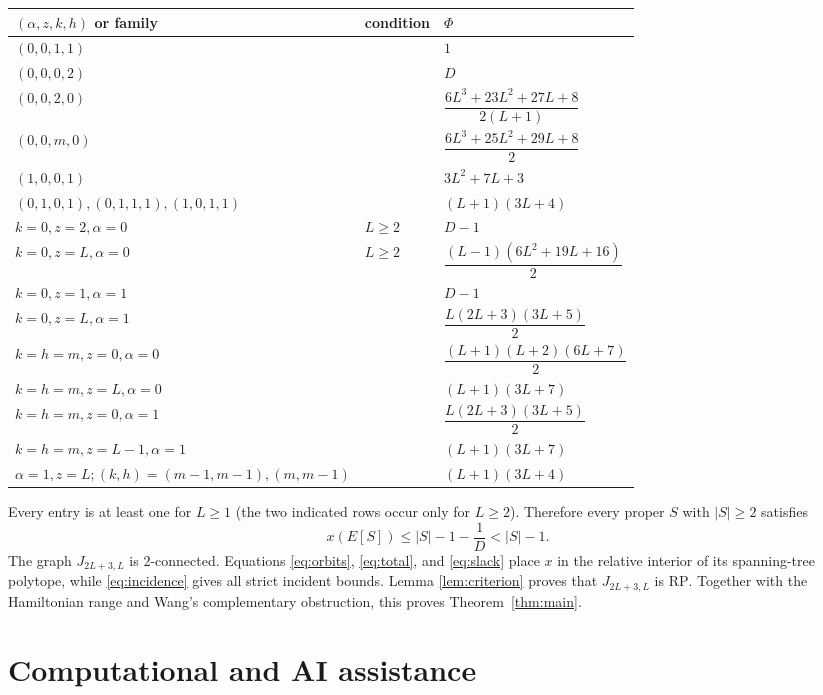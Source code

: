 \documentclass[11pt]{article}
\newcommand{\RP}{\mathrm{RP}}
\begin{document}
\begin{center}
\small
\begin{tabular}{@{}lll@{}}
\toprule
$(\alpha,z,k,h)$ or family & condition & $\Phi$ \\
\midrule
$(0,0,1,1)$ && $1$\\
$(0,0,0,2)$ && $D$\\
$(0,0,2,0)$ && $\dfrac{6L^3+23L^2+27L+8}{2(L+1)}$\\
$(0,0,m,0)$ && $\dfrac{6L^3+25L^2+29L+8}{2}$\\
$(1,0,0,1)$ && $3L^2+7L+3$\\
$(0,1,0,1),(0,1,1,1),(1,0,1,1)$ && $(L+1)(3L+4)$\\
$k=0,z=2,\alpha=0$ & $L\geq2$ & $D-1$\\
$k=0,z=L,\alpha=0$ & $L\geq2$ & $\dfrac{(L-1)(6L^2+19L+16)}2$\\
$k=0,z=1,\alpha=1$ && $D-1$\\
$k=0,z=L,\alpha=1$ && $\dfrac{L(2L+3)(3L+5)}2$\\
$k=h=m,z=0,\alpha=0$ && $\dfrac{(L+1)(L+2)(6L+7)}2$\\
$k=h=m,z=L,\alpha=0$ && $(L+1)(3L+7)$\\
$k=h=m,z=0,\alpha=1$ && $\dfrac{L(2L+3)(3L+5)}2$\\
$k=h=m,z=L-1,\alpha=1$ && $(L+1)(3L+7)$\\
$\alpha=1,z=L;(k,h)=(m-1,m-1),(m,m-1)$
&& $(L+1)(3L+4)$\\
\bottomrule
\end{tabular}
\end{center}

Every entry is at least one for $L\geq1$ (the two indicated rows occur only
for $L\geq2$).  Therefore every proper $S$ with $|S|\geq2$ satisfies
\begin{equation}\label{eq:slack}
 x(E[S])\leq |S|-1-\frac1D<|S|-1.
\end{equation}
The graph $J_{2L+3,L}$ is $2$-connected.  Equations
\eqref{eq:orbits}, \eqref{eq:total}, and \eqref{eq:slack} place $x$ in the
relative interior of its spanning-tree polytope, while
\eqref{eq:incidence} gives all strict incident bounds.  Lemma
\ref{lem:criterion} proves that $J_{2L+3,L}$ is \(\RP\).  Together with the
Hamiltonian range and Wang's complementary obstruction, this proves
Theorem~\ref{thm:main}.

\section*{Computational and AI assistance}
\end{document}
